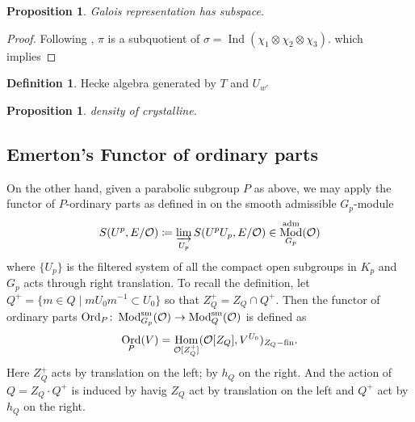 \documentclass[leqno]{amsart}
\DeclareMathOperator{\Mod}{\textnormal{Mod}}
\DeclareMathOperator{\Ord}{Ord}
\newcommand{\sm}{\textnormal{sm}}
\newcommand{\adm}{\textnormal{adm}}
\newcommand{\fin}{\textnormal{fin}}
\newcommand{\oo}{\mathcal{O}} %
\DeclareMathOperator{\Hom}{Hom}
\DeclareMathOperator{\Ind}{Ind}
\newtheorem{prop}[thm]{Proposition}
\theoremstyle{definition}
\newtheorem{defn}[thm]{Definition}
\theoremstyle{remark}
\begin{document}
\begin{prop}
	Galois representation has subspace.
\end{prop}
\begin{proof}
	Following \cite[Lem 2.30]{ger},
	$\pi$ is a subquotient of 
	$\sigma=\Ind(\chi_1\otimes\chi_2\otimes\chi_3)$.
	which implies 
\end{proof}

\begin{defn}
	Hecke algebra 
	generated by $T$ and $  U_{w'}$
\end{defn}

\begin{prop}
	density of crystalline.
\end{prop}



\subsection{Emerton's Functor of ordinary parts}

On the other hand,
given a parabolic subgroup $P$ as above, 
we may apply 
the functor of $P$-ordinary parts as defined in \cite{emeI}
on the smooth admissible $G_p$-module
\[
	S(U^p,E/\oo)\coloneqq
	\varinjlim_{U_p}S(U^pU_p,E/\oo)\in 
	\Mod^{\adm}_{G_p}(\oo)
\]
where $\{U_p\}$ is the filtered system of 
all the compact open subgroups in $K_p$
and $G_p$ acts through right translation.
To recall the definition,
let $Q^+=\{m\in Q\mid mU_0m^{-1}\subset U_0\}$ 
so that $Z_Q^+=Z_Q\cap Q^+$.
Then the functor of ordinary parts
$ \Ord_P\colon \Mod^{\sm}_{G_p}(\oo)\to \Mod^{\sm}_Q(\oo)$
is defined as
\[
	\Ord_P(V)=\Hom_{\oo[Z_Q^+]}(\oo[Z_Q], V^{U_0})_{Z_Q-\fin}.
\]
Here $Z_Q^+$ acts by translation on the left; by $h_Q$ on the right.
And the action of $Q=Z_Q\cdot Q^+$ is induced by 
havig $Z_Q$ act by translation on the left and 
$Q^+$ act by $h_Q$ on the right.
\end{document}
